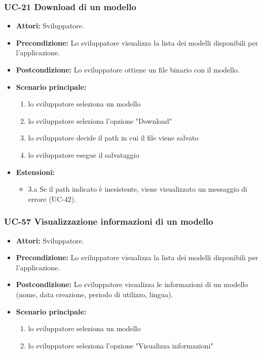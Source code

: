 	\subsubsection{UC-21 Download di un modello}
		\begin{itemize}
			\item \textbf{Attori:} Sviluppatore.
			\item \textbf{Precondizione:} Lo sviluppatore visualizza la lista dei modelli disponibili per l'applicazione.
			\item \textbf{Postcondizione:} Lo sviluppatore ottiene un file binario con il modello.
			\item \textbf{Scenario principale:}
			\begin{enumerate}
				\item lo sviluppatore seleziona un modello
				\item lo sviluppatore seleziona l'opzione "Download"
				\item lo sviluppatore decide il path in cui il file viene salvato
				\item lo sviluppatore esegue il salvataggio
			\end{enumerate}
			\item \textbf{Estensioni:}
				\begin{itemize}
					\item 3.a Se il path indicato è inesistente, viene visualizzato un messaggio di errore (UC-42).
				\end{itemize}
		\end{itemize}	

	\subsubsection{UC-57 Visualizzazione informazioni di un modello}
		\begin{itemize}
			\item \textbf{Attori:} Sviluppatore.
			\item \textbf{Precondizione:} Lo sviluppatore visualizza la lista dei modelli disponibili per l'applicazione.
			\item \textbf{Postcondizione:} Lo sviluppatore visualizza le informazioni di un modello (nome, data creazione, periodo di utilizzo, lingua).
			\item \textbf{Scenario principale:}
			\begin{enumerate}
				\item lo sviluppatore seleziona un modello
				\item lo sviluppatore seleziona l'opzione "Visualizza informazioni"
				\end{enumerate}
		\end{itemize}
		
